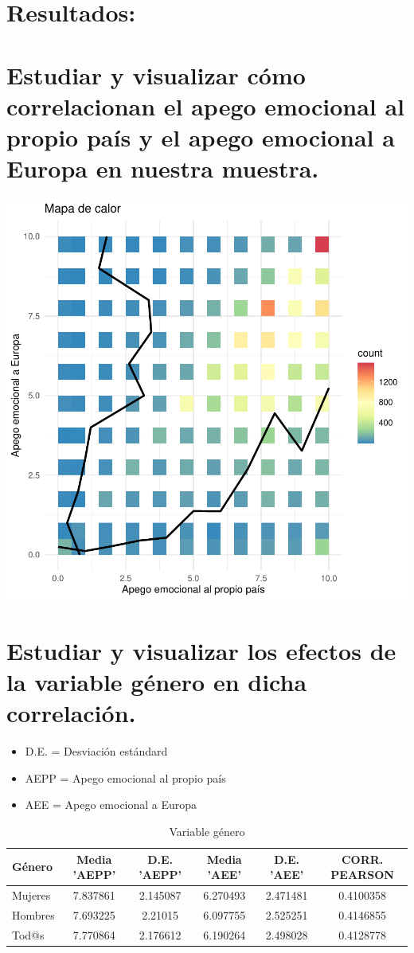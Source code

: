 \documentclass{article}
\begin{document}
\section*{Resultados:}

\section{Estudiar y visualizar cómo correlacionan el apego emocional al propio país y el apego emocional a Europa en nuestra muestra.}

\includegraphics{Informe-004}

\section{Estudiar y visualizar los efectos de la variable género en dicha correlación.}
 \begin{itemize}
 \item D.E. = Desviación estándard
 \item AEPP = Apego emocional al propio país
 \item AEE = Apego emocional a Europa
 \end{itemize}
 \begin{table}[h!]
 \caption{Variable género}
 \begin{tabular}{l | c c c c c}
 \hline
 \bf{Género} & \bf{Media 'AEPP'} & \bf{D.E. 'AEPP'} & \bf{Media 'AEE'} & \bf{D.E. 'AEE'} & \bf{CORR. PEARSON} \\
 \hline
 Mujeres & 7.837861 & 2.145087 & 6.270493 & 2.471481 & 0.4100358 \\
 Hombres & 7.693225 & 2.21015 & 6.097755 & 2.525251 & 0.4146855 \\
 Tod@s & 7.770864 & 2.176612 & 6.190264 & 2.498028 & 0.4128778 \\
 \hline
 \end{tabular}
 \end{table}
\end{document}
